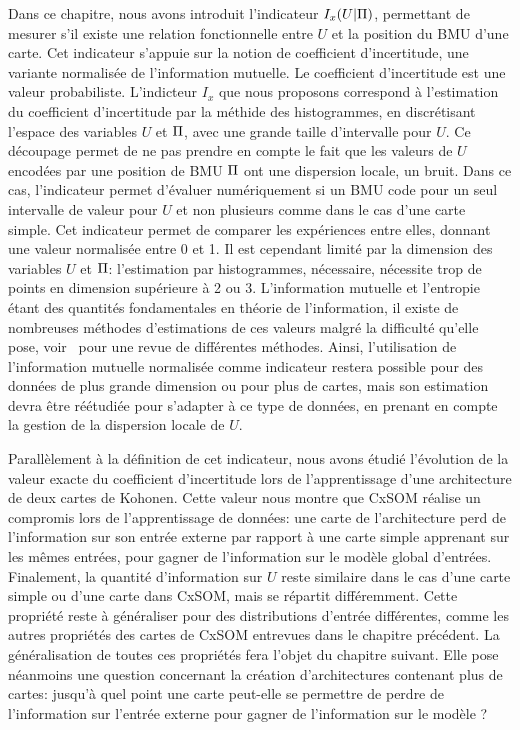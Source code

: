 \documentclass[../main]{subfiles}
\begin{document}
Dans ce chapitre, nous avons introduit l'indicateur $I_x(U|\Pi)$, permettant de mesurer s'il existe une relation fonctionnelle entre $U$ et la position du BMU d'une carte. Cet indicateur s'appuie sur la notion de coefficient d'incertitude, une variante normalisée de l'information mutuelle. Le coefficient d'incertitude est une valeur probabiliste. L'indicteur $I_x$ que nous proposons correspond à l'estimation du coefficient d'incertitude par la méthide des histogrammes, en discrétisant l'espace des variables $U$ et $\Pi$, avec une grande taille d'intervalle pour $U$. Ce découpage permet de ne pas prendre en compte le fait que les valeurs de $U$ encodées par une position de BMU $\Pi$ ont une dispersion locale, un bruit. Dans ce cas, l'indicateur permet d'évaluer numériquement si un BMU code pour un seul intervalle de valeur pour $U$ et non plusieurs comme dans le cas d'une carte simple.
Cet indicateur permet de comparer les expériences entre elles, donnant une valeur normalisée entre 0 et 1.
Il est cependant limité par la dimension des variables $U$ et $\Pi$: l'estimation par histogrammes, nécessaire, nécessite trop de points en dimension supérieure à 2 ou 3.
L'information mutuelle et l'entropie étant des quantités fondamentales en théorie de l'information, il existe de nombreuses méthodes d'estimations de ces valeurs malgré la difficulté qu'elle pose, voir~\cite{Doquire2012ACO} pour une revue de différentes méthodes. 
Ainsi, l'utilisation de l'information mutuelle normalisée comme indicateur restera possible pour des données de plus grande dimension ou pour plus de cartes, mais son estimation devra être réétudiée pour s'adapter à ce type de données, en prenant en compte la gestion de la dispersion locale de $U$.


Parallèlement à la définition de cet indicateur, nous avons étudié l'évolution de la valeur exacte du coefficient d'incertitude lors de l'apprentissage d'une architecture de deux cartes de Kohonen. Cette valeur nous montre que CxSOM réalise un compromis lors de l'apprentissage de données: une carte de l'architecture perd de l'information sur son entrée externe par rapport à une carte simple apprenant sur les mêmes entrées, pour gagner de l'information sur le modèle global d'entrées. Finalement, la quantité d'information sur $U$ reste similaire dans le cas d'une carte simple ou d'une carte dans CxSOM, mais se répartit différemment.
Cette propriété reste à généraliser pour des distributions d'entrée différentes, comme les autres propriétés des cartes de CxSOM entrevues dans le chapitre précédent. La généralisation de toutes ces propriétés fera l'objet du chapitre suivant.
Elle pose néanmoins une question concernant la création d'architectures contenant plus de cartes: jusqu'à quel point une carte peut-elle se permettre de perdre de l'information sur l'entrée externe pour gagner de l'information sur le modèle ? 

\ifSubfilesClassLoaded{
    \printbibliography
}{}
\end{document}
